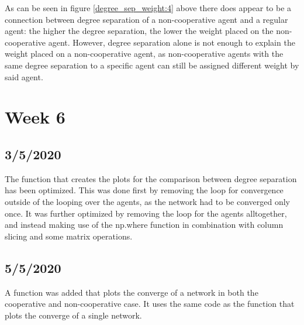 \documentclass{article}
\begin{document}
As can be seen in figure \ref{degree_sep_weight:4} above there does appear to be a connection between degree separation of a non-cooperative agent and a regular agent: the higher the degree separation, the lower the weight placed on the non-cooperative agent. However, degree separation alone is not enough to explain the weight placed on a non-cooperative agent, as non-cooperative agents with the same degree separation to a specific agent can still be assigned different weight by said agent.

\section{Week 6}

\subsection{3/5/2020}
The function that creates the plots for the comparison between degree separation has been optimized. This was done first by removing the loop for convergence outside of the looping over the agents, as the network had to be converged only once. It was further optimized by removing the loop for the agents alltogether, and instead making use of the np.where function in combination with column slicing and some matrix operations.

\subsection{5/5/2020}
A function was added that plots the converge of a network in both the cooperative and non-cooperative case. It uses the same code as the function that plots the converge of a single network.
\end{document}
